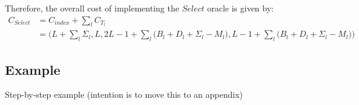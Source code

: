 Therefore, the overall cost of implementing the $\textit{Select}$ oracle is given by:
\begin{equation}
    \begin{split}
    C_{\textit{Select}} &= C_{\textit{index}} + \sum_{l} C_{T_l} \\
    &= \Big(L + \sum_l \Sigma_l, L, 2L - 1 + \sum_l \big( B_l + D_l + \Sigma_l - M_l \big), L-1 + \sum_l \big( B_l + D_l + \Sigma_l - M_l \big)\Big)
    \end{split}
\end{equation}

\subsection{Example}
\label{subsec:example}
Step-by-step example (intention is to move this to an appendix)
